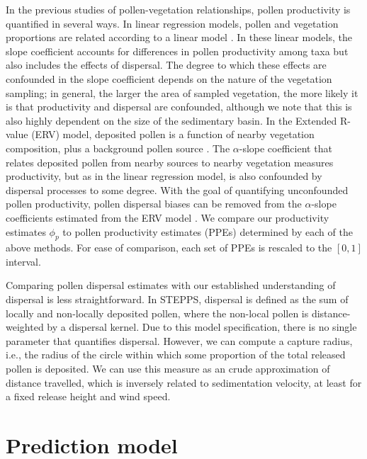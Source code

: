 \documentclass[12pt]{article}
\begin{document}
In the previous studies of pollen-vegetation relationships, pollen
productivity is quantified in several ways. In linear regression
models, pollen and vegetation proportions are related according to a
linear model \citep{bradshaw1985relationships, jackson1990}. In these
linear models, the slope coefficient accounts for differences in
pollen productivity among taxa but also includes the effects of
dispersal. The degree to which these effects are confounded in the
slope coefficient depends on the nature of the vegetation sampling; in
general, the larger the area of sampled vegetation, the more likely it
is that productivity and dispersal are confounded, although we note
that this is also highly dependent on the size of the sedimentary
basin. In the Extended R-value (ERV) model, deposited pollen is a
function of nearby vegetation composition, plus a background pollen
source \citep{prentice1986, prentice1987quantitative,
  marquer2014holocene, brostrom2008pollen}. The $\alpha$-slope
coefficient that relates deposited pollen from nearby sources to
nearby vegetation measures productivity, but as in the linear
regression model, is also confounded by dispersal processes to some
degree. With the goal of quantifying unconfounded pollen productivity,
pollen dispersal biases can be removed from the $\alpha$-slope
coefficients estimated from the ERV model
\citep{sugita1999landscape}. We compare our productivity estimates
$\phi_p$ to pollen productivity estimates (PPEs) determined by each of
the above methods. For ease of comparison, each set of PPEs is
rescaled to the $[0,1]$ interval.

Comparing pollen dispersal estimates with our established
understanding of dispersal is less straightforward. In STEPPS,
dispersal is defined as the sum of locally and non-locally deposited
pollen, where the non-local pollen is distance-weighted by a dispersal
kernel. Due to this model specification, there is no single parameter
that quantifies dispersal. However, we can compute a capture radius,
i.e., the radius of the circle within which some proportion of the
total released pollen is deposited. We can use this measure as an
crude approximation of distance travelled, which is inversely related
to sedimentation velocity, at least for a fixed release height and
wind speed.

\section{Prediction model}
\label{sec:pred}
\end{document}
